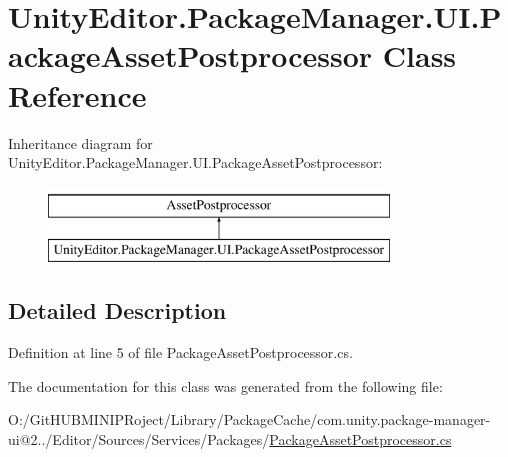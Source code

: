 \hypertarget{class_unity_editor_1_1_package_manager_1_1_u_i_1_1_package_asset_postprocessor}{}\section{Unity\+Editor.\+Package\+Manager.\+U\+I.\+Package\+Asset\+Postprocessor Class Reference}
\label{class_unity_editor_1_1_package_manager_1_1_u_i_1_1_package_asset_postprocessor}
Inheritance diagram for Unity\+Editor.\+Package\+Manager.\+U\+I.\+Package\+Asset\+Postprocessor\+:\begin{figure}[H]
\begin{center}
\leavevmode
\includegraphics[height=2.000000cm]{class_unity_editor_1_1_package_manager_1_1_u_i_1_1_package_asset_postprocessor}
\end{center}
\end{figure}


\subsection{Detailed Description}


Definition at line 5 of file Package\+Asset\+Postprocessor.\+cs.



The documentation for this class was generated from the following file\+:\begin{DoxyCompactItemize}
\item 
O\+:/\+Git\+H\+U\+B\+M\+I\+N\+I\+P\+Roject/\+Library/\+Package\+Cache/com.\+unity.\+package-\/manager-\/ui@2../\+Editor/\+Sources/\+Services/\+Packages/\mbox{\hyperlink{_package_asset_postprocessor_8cs}{Package\+Asset\+Postprocessor.\+cs}}\end{DoxyCompactItemize}
